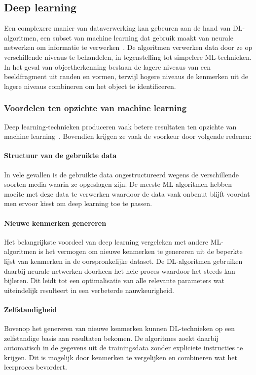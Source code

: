 
\subsection{Deep learning}
\label{subsec:deep-learning-algoritmen}
Een complexere manier van dataverwerking kan gebeuren aan de hand van DL-algoritmen, een subset van machine learning dat gebruik maakt van neurale netwerken om informatie te verwerken~\autocite{Bozic2024}.
De algoritmen verwerken data door ze op verschillende niveaus te behandelen, in tegenstelling tot simpelere ML-technieken.
In het geval van objectherkenning bestaan de lagere niveaus van een beeldfragment uit randen en vormen, terwijl hogere niveaus de kenmerken uit de lagere niveaus combineren om het object te identificeren.

\subsubsection{Voordelen ten opzichte van machine learning}
Deep learning-technieken produceren vaak betere resultaten ten opzichte van machine learning~\autocite{Ahmed2023}.
Bovendien krijgen ze vaak de voorkeur door volgende redenen:

\paragraph{Structuur van de gebruikte data}
In vele gevallen is de gebruikte data ongestructureerd wegens de verschillende soorten media waarin ze opgeslagen zijn.
De meeste ML-algoritmen hebben moeite met deze data te verwerken waardoor de data vaak onbenut blijft voordat men ervoor kiest om deep learning toe te passen.

\paragraph{Nieuwe kenmerken genereren}
Het belangrijkste voordeel van deep learning vergeleken met andere ML-algoritmen is het vermogen om nieuwe kenmerken te genereren uit de beperkte lijst van kenmerken in de oorspronkelijke dataset.
De DL-algoritmen gebruiken daarbij neurale netwerken doorheen het hele proces waardoor het steeds kan bijleren.
Dit leidt tot een optimalisatie van alle relevante parameters wat uiteindelijk resulteert in een verbeterde nauwkeurigheid.

\paragraph{Zelfstandigheid}
Bovenop het genereren van nieuwe kenmerken kunnen DL-technieken op een zelfstandige basis aan resultaten bekomen.
De algoritmes zoekt daarbij automatisch in de gegevens uit de trainingsdata zonder expliciete instructies te krijgen.
Dit is mogelijk door kenmerken te vergelijken en combineren wat het leerproces bevordert.

